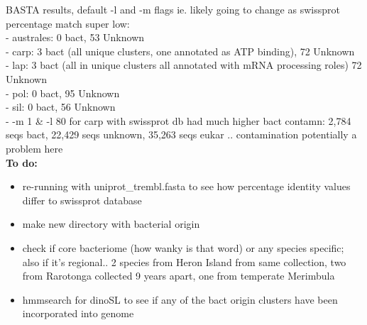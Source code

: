 \documentclass[12pt]{article}
\begin{document}
BASTA results, default -l and -m flags ie. likely going to change as swissprot percentage match super low:\\
- australes: 0 bact, 53 Unknown \\
- carp: 3 bact (all unique clusters, one annotated as ATP binding), 72 Unknown \\
- lap: 3 bact (all in unique clusters all annotated with mRNA processing roles) 72 Unknown \\
- pol: 0 bact, 95 Unknown \\
- sil: 0 bact, 56 Unknown \\
- -m 1 \& -l 80 for carp with swissprot db had much higher bact contamn: 2,784 seqs bact, 22,429 seqs unknown, 35,263 seqs eukar .. contamination potentially a problem here \\
\textbf{To do:}
\begin{itemize}
\item re-running with uniprot\_trembl.fasta to see how percentage identity values differ to swissprot database
\item make new directory with bacterial origin 
\item check if core bacteriome (how wanky is that word) or any species specific; also if it's regional.. 2 species from Heron Island from same collection, two from Rarotonga collected 9 years apart, one from temperate Merimbula
\item hmmsearch for dinoSL to see if any of the bact origin clusters have been incorporated into genome
\end{itemize}
\end{document}
